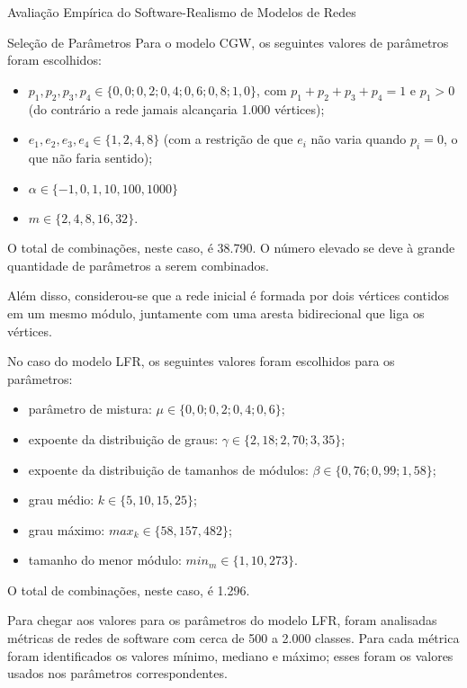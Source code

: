 \begin{section}{Avaliação Empírica do Software-Realismo de Modelos de Redes}
\begin{subsection}{Seleção de Parâmetros}
Para o modelo CGW, os seguintes valores de parâmetros foram escolhidos:

\begin{itemize}
	\item $p_1, p_2, p_3, p_4 \in \{0,0; 0,2; 0,4; 0,6; 0,8; 1,0\}$, com $p_1 + p_2 + p_3 + p_4 = 1$ e $p_1 > 0$ (do contrário a rede jamais alcançaria 1.000 vértices);
	\item $e_1, e_2, e_3, e_4 \in \{1, 2, 4, 8\}$ (com a restrição de que $e_i$ não varia quando $p_i = 0$, o que não faria sentido);
	\item $\alpha \in \{-1, 0, 1, 10, 100, 1000\}$
	\item $m \in \{2, 4, 8, 16, 32\}$.
\end{itemize}

O total de combinações, neste caso, é 38.790. O número elevado se deve à grande quantidade de parâmetros a serem combinados.

Além disso, considerou-se que a rede inicial é formada por dois vértices contidos em um mesmo módulo, juntamente com uma aresta bidirecional que liga os vértices.

No caso do modelo LFR, os seguintes valores foram escolhidos para os parâmetros:

\begin{itemize}
	\item parâmetro de mistura: $\mu \in \{0,0; 0,2; 0,4; 0,6\}$;
	\item expoente da distribuição de graus: $\gamma \in \{2,18; 2,70; 3,35\}$;
	\item expoente da distribuição de tamanhos de módulos: $\beta \in \{0,76; 0,99; 1,58\}$;
	\item grau médio: $k \in \{5, 10, 15, 25\}$;
	\item grau máximo: $max_k \in \{58, 157, 482\}$;
	\item tamanho do menor módulo: $min_m \in \{1, 10, 273\}$.
\end{itemize}

O total de combinações, neste caso, é 1.296.

Para chegar aos valores para os parâmetros do modelo LFR, foram analisadas métricas de redes de software com cerca de 500 a 2.000 classes. Para cada métrica foram identificados os valores mínimo, mediano e máximo; esses foram os valores usados nos parâmetros correspondentes.



\end{subsection}
\end{section}
